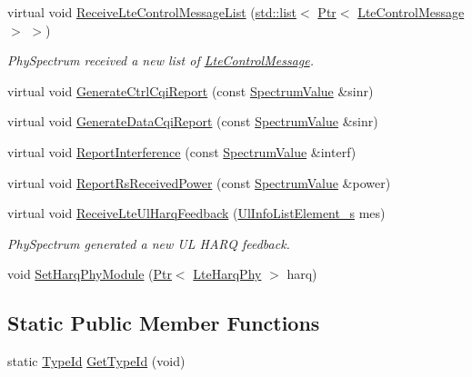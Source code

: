 \begin{DoxyCompactItemize}
virtual void \hyperlink{classns3_1_1LteEnbPhy_aaf721c86e307ca0c9b2b33cad5c6dad4}{Receive\+Lte\+Control\+Message\+List} (\hyperlink{openflow-interface_8h_afd9bcfa176617760671b67580f536fa7}{std\+::list}$<$ \hyperlink{classns3_1_1Ptr}{Ptr}$<$ \hyperlink{classns3_1_1LteControlMessage}{Lte\+Control\+Message} $>$ $>$)
\begin{DoxyCompactList}\small\item\em Phy\+Spectrum received a new list of \hyperlink{classns3_1_1LteControlMessage}{Lte\+Control\+Message}. \end{DoxyCompactList}\item 
virtual void \hyperlink{classns3_1_1LteEnbPhy_abf6978d738fa1f07c4ca36dd1b6fd5b1}{Generate\+Ctrl\+Cqi\+Report} (const \hyperlink{classns3_1_1SpectrumValue}{Spectrum\+Value} \&sinr)
\item 
virtual void \hyperlink{classns3_1_1LteEnbPhy_a606a5f28fc9d71d470d305b967698596}{Generate\+Data\+Cqi\+Report} (const \hyperlink{classns3_1_1SpectrumValue}{Spectrum\+Value} \&sinr)
\item 
virtual void \hyperlink{classns3_1_1LteEnbPhy_a41cfff736fd62873a41e569c7dcc2287}{Report\+Interference} (const \hyperlink{classns3_1_1SpectrumValue}{Spectrum\+Value} \&interf)
\item 
virtual void \hyperlink{classns3_1_1LteEnbPhy_a327c47f6b2657efd8e4678fd915daad1}{Report\+Rs\+Received\+Power} (const \hyperlink{classns3_1_1SpectrumValue}{Spectrum\+Value} \&power)
\item 
virtual void \hyperlink{classns3_1_1LteEnbPhy_aea0e8c3c9fee3a8605db9d1d89a23986}{Receive\+Lte\+Ul\+Harq\+Feedback} (\hyperlink{structns3_1_1UlInfoListElement__s}{Ul\+Info\+List\+Element\+\_\+s} mes)
\begin{DoxyCompactList}\small\item\em Phy\+Spectrum generated a new UL H\+A\+RQ feedback. \end{DoxyCompactList}\item 
void \hyperlink{classns3_1_1LteEnbPhy_a96d36380d67680c378c893adb02934ce}{Set\+Harq\+Phy\+Module} (\hyperlink{classns3_1_1Ptr}{Ptr}$<$ \hyperlink{classns3_1_1LteHarqPhy}{Lte\+Harq\+Phy} $>$ harq)
\end{DoxyCompactItemize}
\subsection*{Static Public Member Functions}
\begin{DoxyCompactItemize}
\item 
static \hyperlink{classns3_1_1TypeId}{Type\+Id} \hyperlink{classns3_1_1LteEnbPhy_ac00094d655f02e4d2eed10491f2b8bf5}{Get\+Type\+Id} (void)
\end{DoxyCompactItemize}
